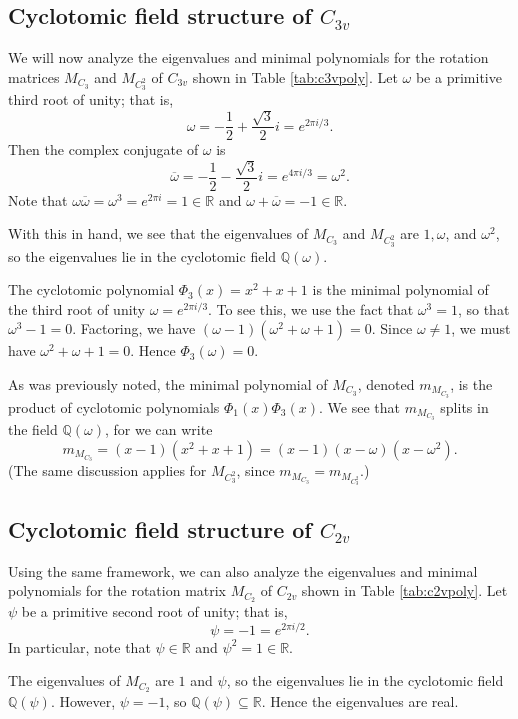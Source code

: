 \documentclass{article}
\begin{document}
    \subsection{Cyclotomic field structure of \texorpdfstring{$C_{3v}$}{C3v}}

    We will now analyze the eigenvalues and minimal polynomials for the rotation matrices $M_{C_3}$ and $M_{C_3^2}$ of $C_{3v}$ shown in Table \ref{tab:c3vpoly}. Let $\omega$ be a primitive third root of unity; that is,
    \[\omega=-\dfrac{1}{2}+\frac{\sqrt{3}}{2}i=e^{2\pi i/3}.\]
    Then the complex conjugate of $\omega$ is \[\overline\omega=-\dfrac{1}{2}-\frac{\sqrt{3}}{2}i=e^{4\pi i/3}=\omega^2.\]
    Note that $\omega\overline\omega = \omega^3 = e^{2\pi i}=1\in\mathbb{R}$ and $\omega+\overline\omega = -1\in\mathbb{R}$.

    With this in hand, we see that the eigenvalues of $M_{C_3}$ and $M_{C_3^2}$ are $1,\omega$, and $\omega^2$, so the eigenvalues lie in the cyclotomic field $\mathbb{Q}(\omega)$.

    The cyclotomic polynomial $\Phi_3(x)=x^2+x+1$ is the minimal polynomial of the third root of unity $\omega=e^{2\pi i/3}$. To see this, we use the fact that $\omega^3=1$, so that $\omega^3-1=0$. Factoring, we have $(\omega-1)(\omega^2+\omega+1)=0$. Since $\omega\neq1$, we must have $\omega^2+\omega+1=0$. Hence $\Phi_3(\omega)=0$.

    As was previously noted, the minimal polynomial of $M_{C_3}$, denoted $m_{M_{C_3}}$, is the product of cyclotomic polynomials $\Phi_1(x)\Phi_3(x)$. We see that $m_{M_{C_3}}$ splits in the field $\mathbb{Q}(\omega)$, for we can write \[m_{M_{C_3}}=(x-1)(x^2+x+1)=(x-1)(x-\omega)(x-\omega^2).\] (The same discussion applies for $M_{C_3^2}$, since $m_{M_{C_3}}=m_{M_{C_3^2}}$.)

    \subsection{Cyclotomic field structure of \texorpdfstring{$C_{2v}$}{C2v}}

    Using the same framework, we can also analyze the eigenvalues and minimal polynomials for the rotation matrix $M_{C_2}$ of $C_{2v}$ shown in Table \ref{tab:c2vpoly}. Let $\psi$ be a primitive second root of unity; that is,
    \[\psi=-1=e^{2\pi i/2}.\]
    In particular, note that $\psi\in\mathbb{R}$ and $\psi^2=1\in\mathbb{R}$.

    The eigenvalues of $M_{C_2}$ are $1$ and $\psi$, so the eigenvalues lie in the cyclotomic field $\mathbb{Q}(\psi)$. However, $\psi=-1$, so $\mathbb{Q}(\psi)\subseteq\mathbb{R}$. Hence the eigenvalues are real.
    
\end{document}
